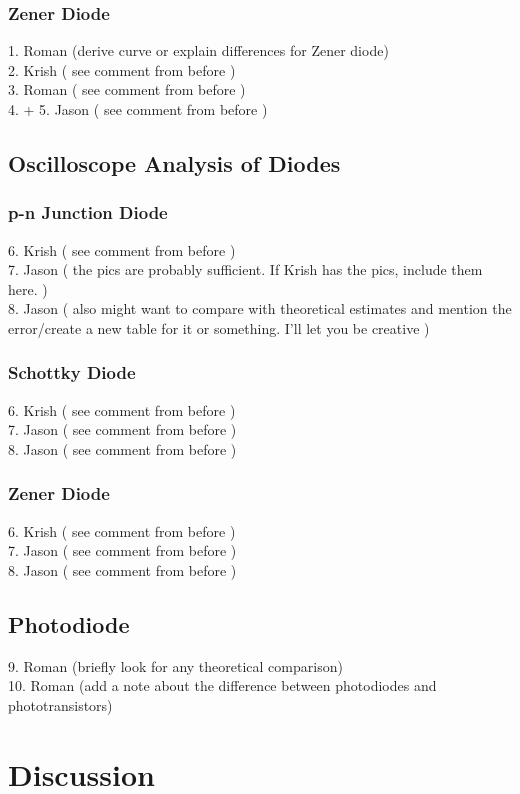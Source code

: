 \documentclass{article}
\newcommand{\subcom}{( see comment from before )}
\begin{document}
\begin{multicols}{2}
			\subsubsection{Zener Diode}
				1. Roman (derive curve or explain differences for Zener diode) \\
				2. Krish \subcom \\
				3. Roman \subcom \\
				4. + 5. Jason \subcom \\
		\subsection{Oscilloscope Analysis of Diodes}
			\subsubsection{p-n Junction Diode}
				6. Krish \subcom \\
				7. Jason ( the pics are probably sufficient. If Krish has the pics, include them here. ) \\
				8. Jason ( also might want to compare with theoretical estimates and mention the error/create a new table for it or something. I'll let you be creative ) \\
			\subsubsection{Schottky Diode}
				6. Krish \subcom \\
				7. Jason \subcom \\
				8. Jason \subcom \\
			\subsubsection{Zener Diode}
				6. Krish \subcom \\
				7. Jason \subcom \\
				8. Jason \subcom \\
		\subsection{Photodiode}
				9. Roman (briefly look for any theoretical comparison) \\
				10. Roman (add a note about the difference between photodiodes and phototransistors) \\
	\section{Discussion}

\end{multicols}
\end{document}
